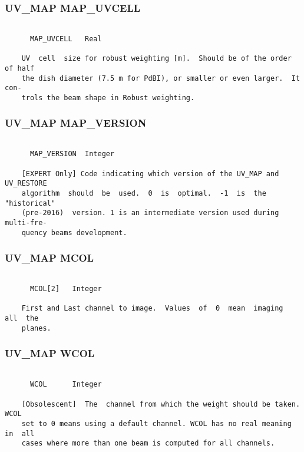 \subsubsection{UV\_MAP MAP\_UVCELL}
\begin{verbatim}

      MAP_UVCELL   Real

    UV  cell  size for robust weighting [m].  Should be of the order of half
    the dish diameter (7.5 m for PdBI), or smaller or even larger.  It  con-
    trols the beam shape in Robust weighting.

\end{verbatim}
\subsubsection{UV\_MAP MAP\_VERSION}
\begin{verbatim}

      MAP_VERSION  Integer

    [EXPERT Only] Code indicating which version of the UV_MAP and UV_RESTORE
    algorithm  should  be  used.  0  is  optimal.  -1  is  the  "historical"
    (pre-2016)  version. 1 is an intermediate version used during multi-fre-
    quency beams development.

\end{verbatim}
\subsubsection{UV\_MAP MCOL}
\begin{verbatim}

      MCOL[2]   Integer

    First and Last channel to image.  Values  of  0  mean  imaging  all  the
    planes.

\end{verbatim}
\subsubsection{UV\_MAP WCOL}
\begin{verbatim}

      WCOL      Integer

    [Obsolescent]  The  channel from which the weight should be taken.  WCOL
    set to 0 means using a default channel. WCOL has no real meaning in  all
    cases where more than one beam is computed for all channels.


\end{verbatim}
